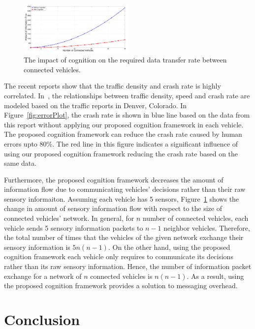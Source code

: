 \documentclass[journal, 11pt]{IEEEtran}
\begin{document}
\begin{figure}[tbh]
  \centering
  \includegraphics[width=0.5\textwidth]{figs/infoFlow.pdf}
  \vspace*{-4mm}
  \caption{{\fontsize{10}{10}\selectfont The impact of cognition on the required
  data transfer rate between connected vehicles.}}
  \label{fig:infoFlow}
  \vspace*{-3mm}
\end{figure}

The recent reports show that the traffic density and crash rate is highly
correlated. In~\cite{trb12}, the relationships between traffic density, speed
and crash rate are modeled based on the traffic reports in Denver, Colorado. In
Figure~\ref{fig:errorPlot}, the crash rate is shown in blue line based on the
data from this report without applying our proposed cognition framework in each
vehicle. The proposed cognition framework can reduce the crash rate caused by
human errors upto $80\%$. The red line in this figure
indicates a significant influence of using our proposed cognition framework
reducing the crash rate based on the same data.


Furthermore, the proposed cognition framework decreases the amount of
information flow due to communicating vehicles' decisions rather than their raw
sensory informaiton. Assuming each vehicle has 5 sensors,
Figure~\ref{fig:infoFlow} shows the change in amount of sensory information flow
with respect to the size of connected vehicles' network. In general, for $n$
number of connected vehicles, each vehicle sends 5 sensory information packets
to $n - 1$ neighbor vehicles. Therefore, the total number of times that the
vehicles of the given network exchange their sensory information is $5n(n-1)$.
On the other hand, using the proposed cognition framework each vehicle only
requires to communicate its decisions rather than its raw sensory information.
Hence, the number of information packet exchange for a network of $n$ connected
vehicles is $n(n-1)$. As a result, using the proposed cognition framework
provides a solution to messaging overhead.

\section{Conclusion}
\label{Conc}
%



% 
\end{document}
